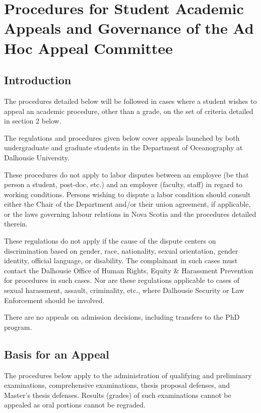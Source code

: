 \section{Procedures for Student Academic Appeals and Governance of the Ad Hoc
Appeal Committee}

\subsection{Introduction}

 The procedures detailed below will be followed in cases where a
student wishes to appeal an academic procedure, other than a grade, on the set
of criteria detailed in section 2 below.   

 The regulations and procedures given below cover appeals launched by
both undergraduate and graduate students in the Department of Oceanography at
Dalhousie University.  

 These procedures do not apply to labor disputes between an employee
(be that person a student, post-doc, etc.) and an employer (faculty, staff) in
regard to working conditions.  Persons wishing to dispute a labor condition
should consult either the Chair of the Department and/or their union agreement,
if applicable, or the laws governing labour relations in Nova Scotia and the
procedures detailed therein. 

 These regulations do not apply if the cause of the dispute centers
on discrimination based on gender, race, nationality, sexual orientation,
gender identity, official language, or disability.  The complainant in such
cases must contact the Dalhousie Office of Human Rights, Equity \& Harassment
Prevention for procedures in such cases.  Nor are these regulations applicable
to cases of sexual harassment, assault, criminality, etc., where Dalhousie
Security or Law Enforcement should be involved.  

 There are no appeals on admission decisions, including transfers to
the PhD program.  

\subsection{Basis for an Appeal}

 The procedures below apply to the administration of qualifying and
preliminary examinations, comprehensive examinations, thesis proposal defenses,
and Master's thesis defenses.  Results (grades) of such examinations cannot be
appealed as oral portions cannot be regraded.  

